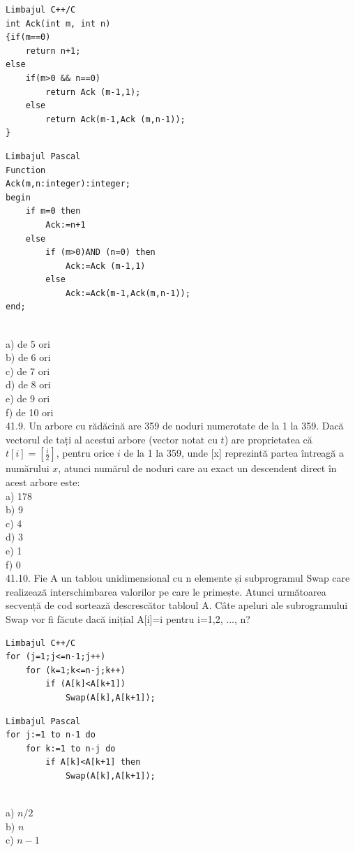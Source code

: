 \begin{itemize}
\begin{enumerate}
\begin{verbatim}
Limbajul C++/C
int Ack(int m, int n)
{if(m==0)
    return n+1;
else
    if(m>0 && n==0)
        return Ack (m-1,1);
    else
        return Ack(m-1,Ack (m,n-1));
}
\end{verbatim}
\begin{verbatim}
Limbajul Pascal
Function
Ack(m,n:integer):integer;
begin
    if m=0 then
        Ack:=n+1
    else
        if (m>0)AND (n=0) then
            Ack:=Ack (m-1,1)
        else
            Ack:=Ack(m-1,Ack(m,n-1));
end;
\end{verbatim}
\\
a) de 5 ori
\\
b) de 6 ori
\\
c) de 7 ori
\\
d) de 8 ori
\\
e) de 9 ori
\\
f) de 10 ori
\\
41.9. Un arbore cu rădăcină are 359 de noduri numerotate de la 1 la 359. Dacă vectorul de tați al acestui arbore (vector notat cu $t$) are proprietatea că $t[i]=\left[\frac{i}{2}\right]$, pentru orice $i$ de la 1 la 359, unde [x] reprezintă partea întreagă a numărului $x$, atunci numărul de noduri care au exact un descendent direct în acest arbore este:
\\
a) 178
\\
b) 9
\\
c) 4
\\
d) 3
\\
e) 1
\\
f) 0
\\
41.10. Fie A un tablou unidimensional cu n elemente și subprogramul Swap care realizează interschimbarea valorilor pe care le primește. Atunci următoarea secvență de cod sortează descrescător tabloul A. Câte apeluri ale subrogramului Swap vor fi făcute dacă inițial A[i]=i pentru i=1,2, ..., n?
\begin{verbatim}
Limbajul C++/C
for (j=1;j<=n-1;j++)
    for (k=1;k<=n-j;k++)
        if (A[k]<A[k+1])
            Swap(A[k],A[k+1]);
\end{verbatim}
\begin{verbatim}
Limbajul Pascal
for j:=1 to n-1 do
    for k:=1 to n-j do
        if A[k]<A[k+1] then
            Swap(A[k],A[k+1]);
\end{verbatim}
\\
a) $n/2$
\\
b) $n$
\\
c) $n-1$
\\

\end{enumerate}
\end{itemize}
